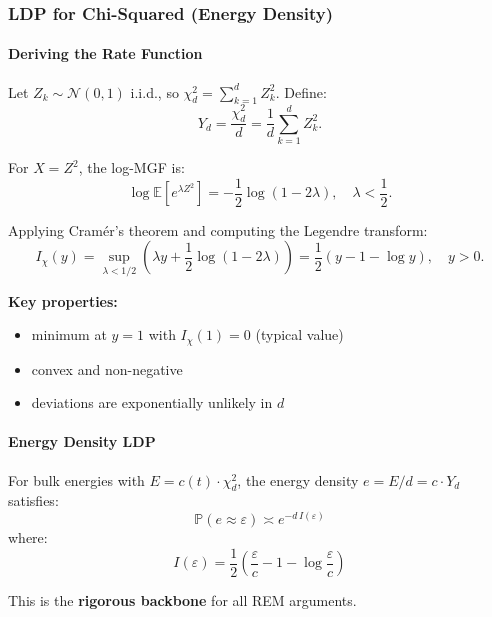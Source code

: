 \documentclass[11pt]{article}
\begin{document}
\subsubsection{LDP for Chi-Squared (Energy Density)}
\paragraph{Deriving the Rate Function}
Let $Z_k \sim \mathcal{N}(0,1)$ i.i.d., so $\chi_d^2 = \sum_{k=1}^d Z_k^2$. Define:
\begin{equation}
Y_d = \frac{\chi_d^2}{d} = \frac{1}{d}\sum_{k=1}^d Z_k^2.
\end{equation}

For $X = Z^2$, the log-MGF is:
\begin{equation}
\log \mathbb{E}[e^{\lambda Z^2}] = -\frac{1}{2}\log(1 - 2\lambda), \quad \lambda < \frac{1}{2}.
\end{equation}

Applying Cram\'er's theorem and computing the Legendre transform:
\begin{equation}
I_\chi(y) = \sup_{\lambda < 1/2}\left(\lambda y + \frac{1}{2}\log(1 - 2\lambda)\right) = \frac{1}{2}(y - 1 - \log y), \quad y > 0.
\end{equation}

\textbf{Key properties:}
\begin{itemize}
\item minimum at $y = 1$ with $I_\chi(1) = 0$ (typical value)
\item convex and non-negative
\item deviations are exponentially unlikely in $d$
\end{itemize}

\paragraph{Energy Density LDP}
For bulk energies with $E = c(t) \cdot \chi_d^2$, the energy density $e = E/d = c \cdot Y_d$ satisfies:
\begin{equation}
\mathbb{P}(e \approx \varepsilon) \asymp e^{-d \, I(\varepsilon)}
\end{equation}
where:
\begin{equation}
\boxed{
I(\varepsilon) = \frac{1}{2}\left(\frac{\varepsilon}{c} - 1 - \log\frac{\varepsilon}{c}\right)
}
\end{equation}

This is the \textbf{rigorous backbone} for all REM arguments.
\end{document}
